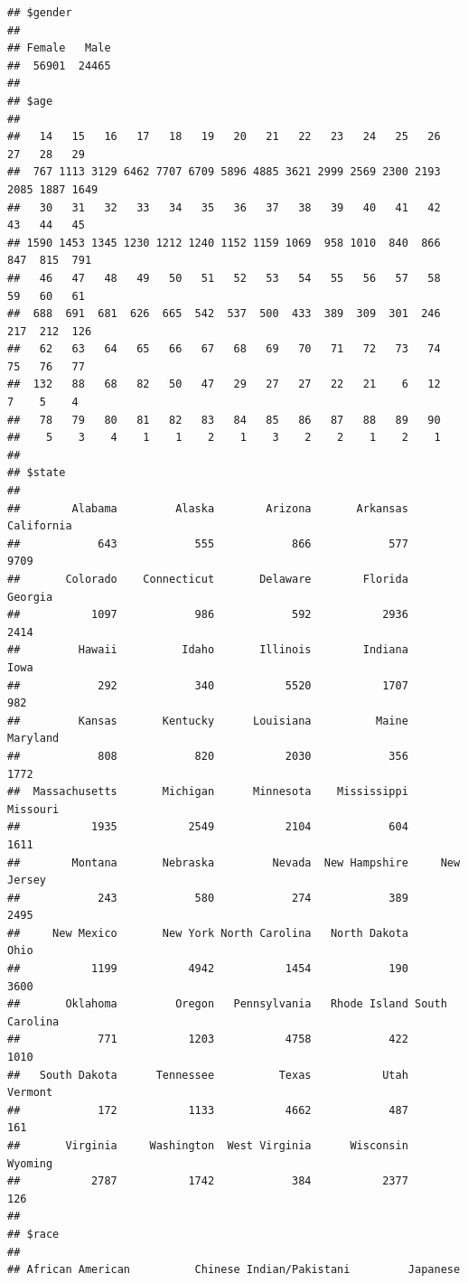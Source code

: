 \documentclass[
  english,
  man]{apa6}
\begin{document}
\begin{verbatim}
## $gender
## 
## Female   Male 
##  56901  24465 
## 
## $age
## 
##   14   15   16   17   18   19   20   21   22   23   24   25   26   27   28   29 
##  767 1113 3129 6462 7707 6709 5896 4885 3621 2999 2569 2300 2193 2085 1887 1649 
##   30   31   32   33   34   35   36   37   38   39   40   41   42   43   44   45 
## 1590 1453 1345 1230 1212 1240 1152 1159 1069  958 1010  840  866  847  815  791 
##   46   47   48   49   50   51   52   53   54   55   56   57   58   59   60   61 
##  688  691  681  626  665  542  537  500  433  389  309  301  246  217  212  126 
##   62   63   64   65   66   67   68   69   70   71   72   73   74   75   76   77 
##  132   88   68   82   50   47   29   27   27   22   21    6   12    7    5    4 
##   78   79   80   81   82   83   84   85   86   87   88   89   90 
##    5    3    4    1    1    2    1    3    2    2    1    2    1 
## 
## $state
## 
##        Alabama         Alaska        Arizona       Arkansas     California 
##            643            555            866            577           9709 
##       Colorado    Connecticut       Delaware        Florida        Georgia 
##           1097            986            592           2936           2414 
##         Hawaii          Idaho       Illinois        Indiana           Iowa 
##            292            340           5520           1707            982 
##         Kansas       Kentucky      Louisiana          Maine       Maryland 
##            808            820           2030            356           1772 
##  Massachusetts       Michigan      Minnesota    Mississippi       Missouri 
##           1935           2549           2104            604           1611 
##        Montana       Nebraska         Nevada  New Hampshire     New Jersey 
##            243            580            274            389           2495 
##     New Mexico       New York North Carolina   North Dakota           Ohio 
##           1199           4942           1454            190           3600 
##       Oklahoma         Oregon   Pennsylvania   Rhode Island South Carolina 
##            771           1203           4758            422           1010 
##   South Dakota      Tennessee          Texas           Utah        Vermont 
##            172           1133           4662            487            161 
##       Virginia     Washington  West Virginia      Wisconsin        Wyoming 
##           2787           1742            384           2377            126 
## 
## $race
## 
## African American          Chinese Indian/Pakistani         Japanese 

\end{verbatim}
\end{document}
